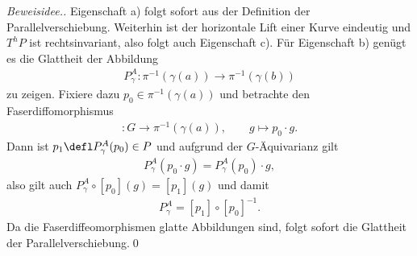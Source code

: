 \documentclass[%
	paper=a5,%
	fleqn,%
	DIV=18,%
	BCOR=0mm,
	fontsize=11pt,
	titlepage=false,%
	bibliography=totoc,
	DIV=18,%
	twoside=true,
	pdftitle=Riemannsche Geometrie,
	pdfauthor=Uwe Semmelmann,
	numbers=noendperiod]%
	{scrbook}
\begin{document}
\begin{proof}[Beweisidee.]
Eigenschaft a) folgt sofort aus der Definition der Parallelverschiebung. 
Weiterhin ist der horizontale Lift einer Kurve eindeutig und $T^hP$ ist
rechtsinvariant, also folgt auch Eigenschaft c).
Für Eigenschaft b) genügt es die Glattheit der Abbildung
\begin{align*}
P_\gamma^A : \pi^{-1}(\gamma(a)) \to \pi^{-1}(\gamma(b))
\end{align*}
zu zeigen. Fixiere dazu $p_0 \in \pi^{-1}(\gamma(a))$ und betrachte den
Faserdiffomorphismus
\begin{align*}
[p_0]: G\to \pi^{-1}(\gamma(a)),\qquad g\mapsto p_0 \cdot g.
\end{align*}
Dann ist $p_1 \defl P_\gamma^A(p_0)\in P$ und aufgrund der $G$-Äquivarianz gilt
\begin{align*}
P_\gamma^A(p_0\cdot g) = P_\gamma^A(p_0)\cdot g,
\end{align*}
also gilt auch $P_\gamma^A\circ [p_0](g) = [p_1](g)$ und damit
\begin{align*}
P_\gamma^A = [p_1]\circ [p_0]^{-1}.
\end{align*}
Da die Faserdiffeomorphismen glatte Abbildungen sind, folgt sofort die Glattheit
der Parallelverschiebung.\qed
\end{proof}
\end{document}
